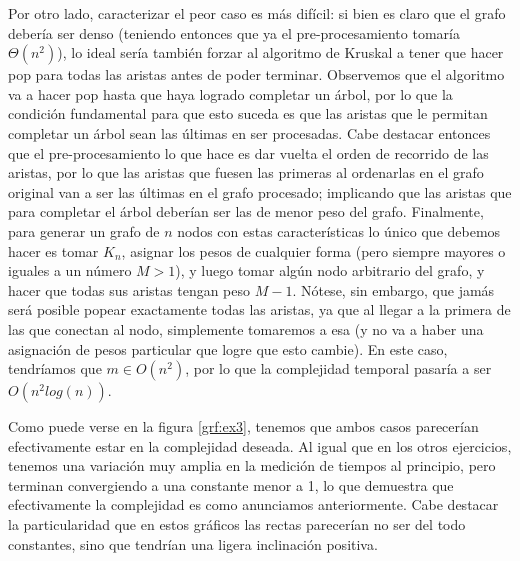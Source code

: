 \documentclass{article}
\theoremstyle{definition}
\theoremstyle{remark}
\begin{document}
Por otro lado, caracterizar el peor caso es más difícil: si bien es claro que el grafo debería ser denso (teniendo entonces que ya el pre-procesamiento tomaría $\Theta(n^2)$), lo ideal sería también forzar al algoritmo de Kruskal a tener que hacer pop para todas las aristas antes de poder terminar. Observemos que el algoritmo va a hacer pop hasta que haya logrado completar un árbol, por lo que la condición fundamental para que esto suceda es que las aristas que le permitan completar un árbol sean las últimas en ser procesadas. Cabe destacar entonces que el pre-procesamiento lo que hace es dar vuelta el orden de recorrido de las aristas, por lo que las aristas que fuesen las primeras al ordenarlas en el grafo original van a ser las últimas en el grafo procesado; implicando que las aristas que para completar el árbol deberían ser las de menor peso del grafo. Finalmente, para generar un grafo de $n$ nodos con estas características lo único que debemos hacer es tomar $K_n$, asignar los pesos de cualquier forma (pero siempre mayores o iguales a un número $M > 1$), y luego tomar algún nodo arbitrario del grafo, y hacer que todas sus aristas tengan peso $M - 1$. Nótese, sin embargo, que jamás será posible popear exactamente todas las aristas, ya que al llegar a la primera de las que conectan al nodo, simplemente tomaremos a esa (y no va a haber una asignación de pesos particular que logre que esto cambie). En este caso, tendríamos que $m \in O(n^2)$, por lo que la complejidad temporal pasaría a ser $O(n^2 log(n))$.

Como puede verse en la figura \ref{grf:ex3}, tenemos que ambos casos parecerían efectivamente estar en la complejidad deseada. Al igual que en los otros ejercicios, tenemos una variación muy amplia en la medición de tiempos al principio, pero terminan convergiendo a una constante menor a 1, lo que demuestra que efectivamente la complejidad es como anunciamos anteriormente. Cabe destacar la particularidad que en estos gráficos las rectas parecerían no ser del todo constantes, sino que tendrían una ligera inclinación positiva.

\end{document}
